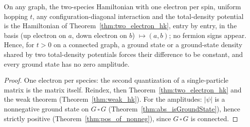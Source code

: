 \begin{theorem}
  \label{thm:two_electron_bridge}
  \leanok
  On any graph, the two-species Hamiltonian with one electron per spin, uniform hopping $t$, any configuration-diagonal
  interaction and the total-density potential is the Hamiltonian of Theorem~\ref{thm:two_electron_hk}, entry by
  entry, in the basis (up electron on $a$, down electron on $b$) $\mapsto(a,b)$; no fermion signs appear. Hence, for
  $t>0$ on a connected graph, a ground state or a ground-state density shared by two total-density potentials forces
  their difference to be constant, and every ground state has no zero amplitude.
\end{theorem}
\begin{proof}
  \leanok
  One electron per species: the second quantization of a single-particle matrix is the matrix itself. Reindex, then
  Theorem~\ref{thm:two_electron_hk} and the weak theorem (Theorem~\ref{thm:weak_hk}). For the amplitudes: $|\psi|$ is
  a nonnegative ground state on $G\,\square\,G$ (Theorem~\ref{thm:abs_isGroundState}), hence strictly positive
  (Theorem~\ref{thm:pos_of_nonneg}), since $G\,\square\,G$ is connected.
\end{proof}
